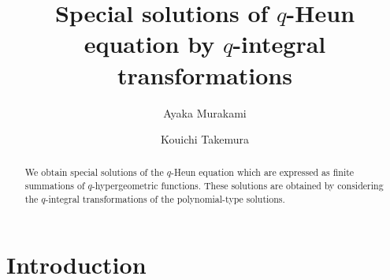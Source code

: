 \documentclass[12pt]{amsart}
\numberwithin{equation}{section}
\theoremstyle{definition}
\theoremstyle{remark}
\begin{document}
\title[Special solutions of $q$-Heun equation by $q$-integral transformations]
{Special solutions of $q$-Heun equation by $q$-integral transformations}
\author{Ayaka Murakami}
\address{Department of Mathematics, Ochanomizu University, 2-1-1 Otsuka, Bunkyo-ku, Tokyo 112-8610, Japan}
\author{Kouichi Takemura}
\address{Department of Mathematics, Ochanomizu University, 2-1-1 Otsuka, Bunkyo-ku, Tokyo 112-8610, Japan}
\begin{abstract}
We obtain special solutions of the $q$-Heun equation which are expressed as finite summations of $q$-hypergeometric functions.
These solutions are obtained by considering the $q$-integral transformations of the polynomial-type solutions.
\end{abstract}
\maketitle



\section{Introduction}
\end{document}
